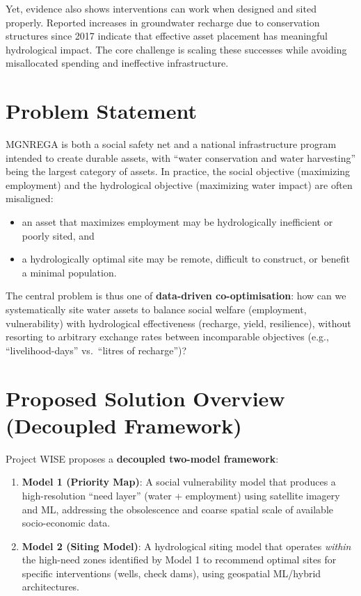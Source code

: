 \documentclass[12pt,a4paper]{report}
\begin{document}
Yet, evidence also shows interventions can work when designed and sited properly. Reported increases in groundwater recharge due to conservation structures since 2017 indicate that effective asset placement has meaningful hydrological impact. The core challenge is scaling these successes while avoiding misallocated spending and ineffective infrastructure.

\section{Problem Statement}
MGNREGA is both a social safety net and a national infrastructure program intended to create durable assets, with “water conservation and water harvesting” being the largest category of assets. In practice, the social objective (maximizing employment) and the hydrological objective (maximizing water impact) are often misaligned:
\begin{itemize}
  \item an asset that maximizes employment may be hydrologically inefficient or poorly sited, and
  \item a hydrologically optimal site may be remote, difficult to construct, or benefit a minimal population.
\end{itemize}

The central problem is thus one of \textbf{data-driven co-optimisation}: how can we systematically site water assets to balance social welfare (employment, vulnerability) with hydrological effectiveness (recharge, yield, resilience), without resorting to arbitrary exchange rates between incomparable objectives (e.g., “livelihood-days” vs.\ “litres of recharge”)?

\section{Proposed Solution Overview (Decoupled Framework)}
Project WISE proposes a \textbf{decoupled two-model framework}:
\begin{enumerate}[label=\textbf{M\arabic*.}]
  \item \textbf{Model 1 (Priority Map)}: A social vulnerability model that produces a high-resolution “need layer” (water + employment) using satellite imagery and ML, addressing the obsolescence and coarse spatial scale of available socio-economic data.
  \item \textbf{Model 2 (Siting Model)}: A hydrological siting model that operates \textit{within} the high-need zones identified by Model 1 to recommend optimal sites for specific interventions (wells, check dams), using geospatial ML/hybrid architectures.
\end{enumerate}
\end{document}

